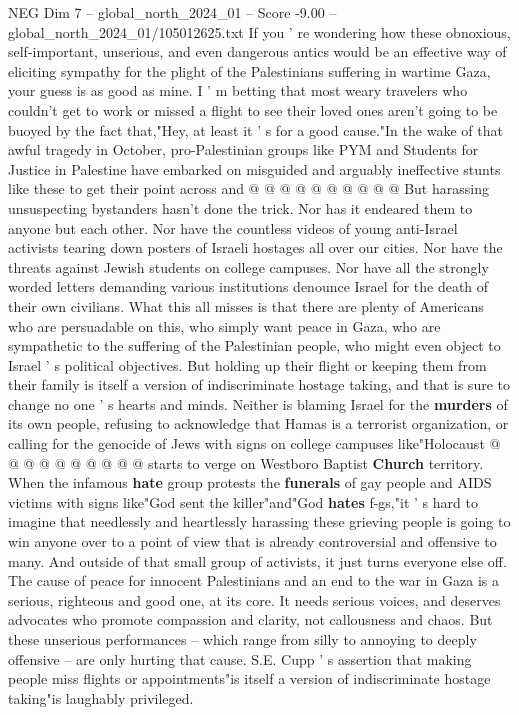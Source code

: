 \begin{textsample}{NEG Dim 7 – global\_north\_2024\_01 – Score -9.00 – global\_north\_2024\_01/105012625.txt}
If you ' re wondering how these obnoxious, self-important, unserious, and even dangerous antics would be an effective way of eliciting sympathy for the plight of the Palestinians suffering in wartime Gaza, your guess is as good as mine.
I ' m betting that most weary travelers who couldn't get to work or missed a flight to see their loved ones aren't going to be buoyed by the fact that,"Hey, at least it ' s for a good cause."In the wake of that awful tragedy in October, pro-Palestinian groups like PYM and Students for Justice in Palestine have embarked on misguided and arguably ineffective stunts like these to get their point across and @ @ @ @ @ @ @ @ @ @ But harassing unsuspecting bystanders hasn't done the trick.
Nor has it endeared them to anyone but each other.
Nor have the countless videos of young anti-Israel activists tearing down posters of Israeli hostages all over our cities.
Nor have the threats against Jewish students on college campuses.
Nor have all the strongly worded letters demanding various institutions denounce Israel for the death of their own civilians.
What this all misses is that there are plenty of Americans who are persuadable on this, who simply want peace in Gaza, who are sympathetic to the suffering of the Palestinian people, who might even object to Israel ' s political objectives.
But holding up their flight or keeping them from their family is itself a version of indiscriminate hostage taking, and that is sure to change no one ' s hearts and minds.
Neither is blaming Israel for the \textbf{murders} of its own people, refusing to acknowledge that Hamas is a terrorist organization, or calling for the genocide of Jews with signs on college campuses like"Holocaust @ @ @ @ @ @ @ @ @ @ starts to verge on Westboro Baptist \textbf{Church} territory.
When the infamous \textbf{hate} group protests the \textbf{funerals} of gay people and AIDS victims with signs like"God sent the killer"and"God \textbf{hates} f-gs,"it ' s hard to imagine that needlessly and heartlessly harassing these grieving people is going to win anyone over to a point of view that is already controversial and offensive to many.
And outside of that small group of activists, it just turns everyone else off.
The cause of peace for innocent Palestinians and an end to the war in Gaza is a serious, righteous and good one, at its core.
It needs serious voices, and deserves advocates who promote compassion and clarity, not callousness and chaos.
But these unserious performances -- which range from silly to annoying to deeply offensive -- are only hurting that cause.
S.E.
Cupp ' s assertion that making people miss flights or appointments"is itself a version of indiscriminate hostage taking"is laughably privileged.

\end{textsample}
